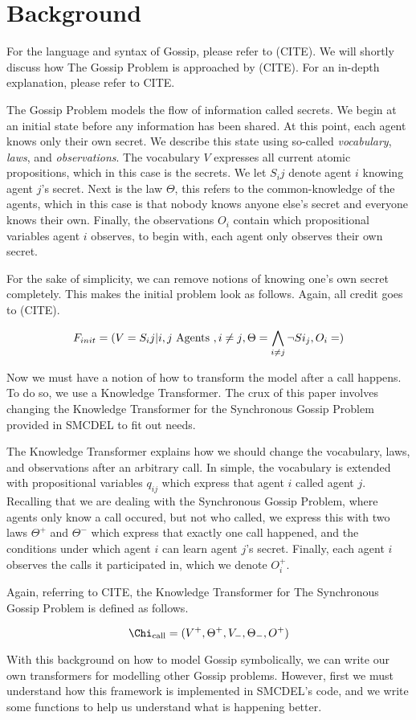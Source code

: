 \section{Background}

For the language and syntax of Gossip, please refer to (CITE). We will shortly discuss how The Gossip Problem is approached by (CITE). For an in-depth explanation, please refer to CITE.

The Gossip Problem models the flow of information called secrets. We begin at an initial state before any information has been shared. At this point, each agent knows only their own secret. We describe this state using so-called \textit{vocabulary}, \textit{laws}, and \textit{observations}. The vocabulary $V$ expresses all current atomic propositions, which in this case is the secrets. We let $S_ij$ denote agent $i$ knowing agent $j$'s secret. Next is the law $\Theta$, this refers to the common-knowledge of the agents, which in this case is that nobody knows anyone else's secret and everyone knows their own. Finally, the observations $O_i$ contain which propositional variables agent $i$ observes, to begin with, each agent only observes their own secret. 

For the sake of simplicity, we can remove notions of knowing one's own secret completely. This makes the initial problem look as follows. Again, all credit goes to (CITE).

$$F_{init} = (V = {S_ij | i, j \text{ Agents }, i \neq j}, \Theta =\bigwedge_{i\neq j} \lnot Si_j , O_i = \empty)$$ 

Now we must have a notion of how to transform the model after a call happens. To do so, we use a Knowledge Transformer. The crux of this paper involves changing the Knowledge Transformer for the Synchronous Gossip Problem provided in SMCDEL to fit out needs. 

The Knowledge Transformer explains how we should change the vocabulary, laws, and observations after an arbitrary call. In simple, the vocabulary is extended with propositional variables $q_{ij}$ which express that agent $i$ called agent $j$. Recalling that we are dealing with the Synchronous Gossip Problem, where agents only know a call occured, but not who called, we express this with two laws $\Theta^+$ and $\Theta^-$ which express that exactly one call happened, and the conditions under which agent $i$ can learn agent $j$'s secret. Finally, each agent $i$ observes the calls it participated in, which we denote $O^+_i$. 

Again, referring to CITE, the Knowledge Transformer for The Synchronous Gossip Problem is defined as follows. 

$$\Chi_\text{call}=(V^+,\Theta^+,V_-,\Theta_-,O^+)$$

With this background on how to model Gossip symbolically, we can write our own transformers for modelling other Gossip problems. However, first we must understand how this framework is implemented in SMCDEL's code, and we write some functions to help us understand what is happening better.
